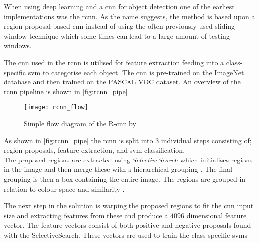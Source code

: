 When using deep learning and a \gls{cnn} for object detection one of the earliest implementations was the \gls{rcnn}. As the name suggests, the method is based upon a region proposal based \gls{cnn} instead of using the often previously used sliding window technique which some times can lead to a large amount of testing windows.

The \gls{cnn} used in the \gls{rcnn} is utilised for feature extraction feeding into a class-specific \gls{svm} to categorise each object. The \gls{cnn} is pre-trained on the ImageNet database and then trained on the PASCAL VOC dataset. An overview of the \gls{rcnn} pipeline is shown in \autoref{fig:rcnn_pipe}

\begin{figure}[h]
	\centering
	\texttt{[image: rcnn\_flow]}
	\caption{Simple flow diagram of the R-\gls{cnn} by \cite{Girshick2014}}
	\label{fig:rcnn_pipe}
\end{figure}

As shown in \autoref{fig:rcnn_pipe} the \gls{rcnn} is split into 3 individual steps consisting of; region proposals, feature extraction, and \gls{svm} classification.\\

The proposed regions are extracted using \textit{SelectiveSearch} which initialises regions in the image and then merge these with a hierarchical grouping \citep{Uijlings2013}. The final grouping is then a box containing the entire image. The regions are grouped in relation to colour space and similarity \citep{Girshick2014}. 

The next step in the solution is warping the proposed regions to fit the \gls{cnn} input size and extracting features from these and produce a $4096$ dimensional feature vector. The feature vectors consist of both positive and negative proposals found with the SelectiveSearch. These vectors are used to train the class specific \gls{svm}s


